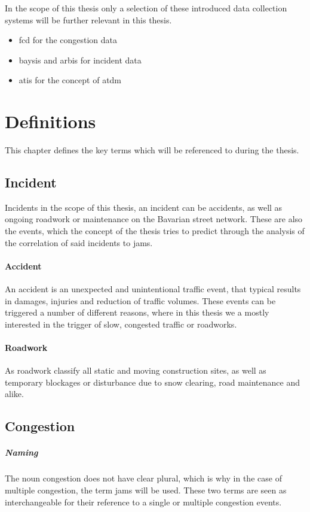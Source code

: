 \documentclass[a4paper,12pt]{report}
\begin{document}
\bigskip

In the scope of this thesis only a selection of these introduced data collection systems will be further relevant in this thesis. 
\begin{itemize}
  \item \acrshort{fcd} for the congestion data
  \item \acrshort{baysis} and \acrshort{arbis} for incident data
  \item \acrshort{atis} for the concept of \acrshort{atdm}
\end{itemize}

\chapter{Definitions}
	This chapter defines the key terms which will be referenced to during the thesis.
\section{Incident}
		Incidents in the scope of this thesis, an incident can be accidents, as well as ongoing roadwork or maintenance on the Bavarian street network. These are also the events, which the concept of the thesis tries to predict through the analysis of the correlation of said incidents to jams.
	\subsubsection{Accident}
		An accident is an unexpected and unintentional traffic event, that typical results in damages, injuries and reduction of traffic volumes. These events can be triggered a number of different reasons, where in this thesis we a mostly interested in the trigger of slow, congested traffic or roadworks.
	\subsubsection{Roadwork}
		As roadwork classify all static and moving construction sites, as well as temporary blockages or disturbance due to snow clearing, road maintenance and alike. 
	
\section{Congestion}
\label{definition_congestion}

\paragraph{Naming} The noun congestion does not have clear plural, which is why in the case of multiple congestion, the term jams will be used. These two terms are seen as interchangeable for their reference to a single or multiple congestion events.
\end{document}
